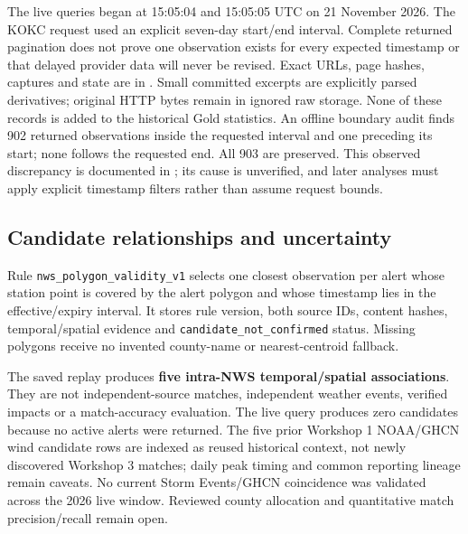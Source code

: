 \documentclass[10pt]{article}
\begin{document}
The live queries began at 15:05:04 and 15:05:05 UTC on 21 November 2026.
The KOKC request used an explicit seven-day start/end interval. Complete returned
pagination does not prove one observation exists for every expected timestamp or
that delayed provider data will never be revised. Exact URLs, page hashes,
captures and state are in . Small committed
excerpts are explicitly parsed derivatives; original HTTP bytes remain in ignored
raw storage. None of these records is added to the historical Gold statistics.
An offline boundary audit finds 902 returned observations inside the requested
interval and one preceding its start; none follows the requested end. All 903
are preserved. This observed discrepancy is documented in
; its cause is unverified, and later
analyses must apply explicit timestamp filters rather than assume request bounds.

\subsection{Candidate relationships and uncertainty}
Rule \texttt{nws\_polygon\_validity\_v1} selects one closest observation per alert
whose station point is covered by the alert polygon and whose timestamp lies in
the effective/expiry interval. It stores rule version, both source IDs, content
hashes, temporal/spatial evidence and \texttt{candidate\_not\_confirmed} status.
Missing polygons receive no invented county-name or nearest-centroid fallback.

The saved replay produces \textbf{five intra-NWS temporal/spatial associations}.
They are not independent-source matches, independent weather events, verified
impacts or a match-accuracy evaluation. The live query produces zero candidates
because no active alerts were returned. The five prior Workshop 1 NOAA/GHCN wind
candidate rows are indexed as reused historical context, not newly discovered
Workshop 3 matches; daily peak timing and common reporting lineage remain caveats.
No current Storm Events/GHCN coincidence was validated across the 2026 live window.
Reviewed county allocation and quantitative match precision/recall remain open.
\end{document}

